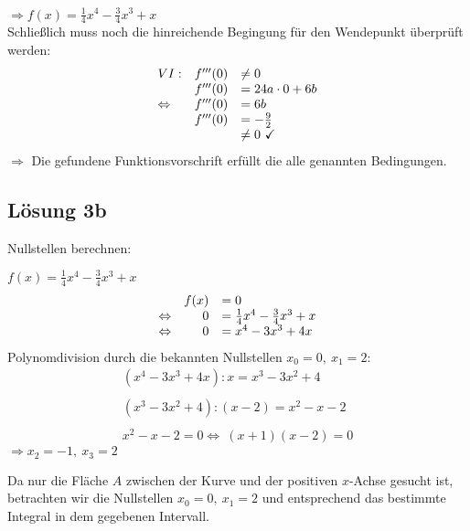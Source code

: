 \documentclass[main.tex]{subfiles}
\begin{document}
$\Rightarrow f( x) =\frac{1}{4} x^{4} -\frac{3}{4} x^{3} +x$\\

Schließlich muss noch die hinreichende Begingung für den Wendepunkt überprüft werden:
\begin{equation*}
\begin{array}{ l r l }
VI: & f'''( 0) & \neq 0\\
 & f'''( 0) & =24a\cdot 0+6b\\
\Leftrightarrow  & f'''( 0) & =6b\\
 & f'''( 0) & =-\frac{9}{2}\\
 &  & \neq 0\ \checkmark 
\end{array}
\end{equation*}
$\Rightarrow $ Die gefundene Funktionsvorschrift erfüllt die alle genannten Bedingungen.

\subsection{Lösung 3b}
\arraycolsep=1.4pt %

Nullstellen berechnen:

$f( x) =\frac{1}{4} x^{4} -\frac{3}{4} x^{3} +x$
\begin{equation*}
\begin{array}{ r r l }
 & f( x) & =0\\
\Leftrightarrow  & 0 & =\frac{1}{4} x^{4} -\frac{3}{4} x^{3} +x\\
\Leftrightarrow  & 0 & =x^{4} -3x^{3} +4x
\end{array}
\end{equation*}
Polynomdivision durch die bekannten Nullstellen $x_{0} =0,\ x_{1} =2$:
\begin{gather*}
\left( x^{4} -3x^{3} +4x\right) :x=x^{3} -3x^{2} +4\\
\\
\left( x^{3} -3x^{2} +4\right) :( x-2) =x^{2} -x-2\\
\\
x^{2} -x-2=0\Leftrightarrow \ ( x+1)( x-2) =0
\end{gather*}
$\Rightarrow x_{2} =-1,\ x_{3} =2$



Da nur die Fläche $A$ zwischen der Kurve und der positiven $x$-Achse gesucht ist, betrachten wir die Nullstellen $x_{0} =0,\ x_{1} =2$ und entsprechend das bestimmte Integral in dem gegebenen Intervall.
\end{document}
